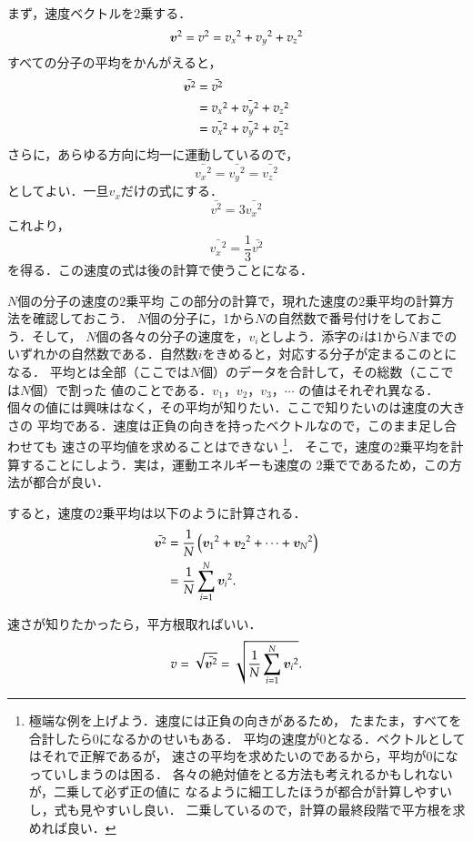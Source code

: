     まず，速度ベクトルを2乗する．
    \[
        {\boldsymbol{v}}^{2} = {v}^{2} = {{v}_{x}}^{2} + {{v}_{y}}^{2} + {{v}_{z}}^{2}
    \]
    すべての分子の平均をかんがえると，
    \begin{align*}
        \bar{{\boldsymbol{v}}^{2}} &= \bar{{v}^{2}} \\
                        &= \bar{{{v}_{x}}^{2} + {{v}_{y}}^{2} + {{v}_{z}}^{2}} \\
                        &= \bar{{{v}_{x}}^{2}} + \bar{{{v}_{y}}^{2}} + \bar{{{v}_{z}}^{2}}
    \end{align*}
    さらに，あらゆる方向に均一に運動しているので，
    \[
        \bar{{{v}_{x}}^{2}} = \bar{{{v}_{y}}^{2}} = \bar{{{v}_{z}}^{2}}
    \]
    としてよい．一旦${v}_{x}$だけの式にする．
    \[
        \bar{{v}^{2}} = 3\bar{{{v}_{x}}^{2}}
    \]
    これより，
    \begin{equation}
        \bar{{{v}_{x}}^{2}} = \frac{1}{3} \bar{{v}^{2}}
    \end{equation}
    を得る．この速度の式は後の計算で使うことになる．

    \begin{memo}{$N$個の分子の速度の2乗平均}
        この部分の計算で，現れた速度の2乗平均の計算方法を確認しておこう．
        $N$個の分子に，1から$N$の自然数で番号付けをしておこう．そして，
        $N$個の各々の分子の速度を，${v}_{i}$としよう．添字の$i$は1から$N$までの
        いずれかの自然数である．自然数$i$をきめると，対応する分子が定まるこのとになる．
        平均とは全部（ここでは$N$個）のデータを合計して，その総数（ここでは$N$個）で割った
        値のことである．${v}_{1}$，${v}_{2}$，${v}_{3}$，$\cdots$ の値はそれぞれ異なる．
        個々の値には興味はなく，その平均が知りたい．ここで知りたいのは速度の大きさの
        平均である．速度は正負の向きを持ったベクトルなので，このまま足し合わせても
        速さの平均値を求めることはできない
            \footnote{
                極端な例を上げよう．速度には正負の向きがあるため，
                たまたま，すべてを合計したら0になるかのせいもある．
                平均の速度が0となる．ベクトルとしてはそれで正解であるが，
                速さの平均を求めたいのであるから，平均が0になっていしまうのは困る．
                各々の絶対値をとる方法も考えれるかもしれないが，二乗して必ず正の値に
                なるように細工したほうが都合が計算しやすいし，式も見やすいし良い．
                二乗しているので，計算の最終段階で平方根を求めれば良い．
            }．
        そこで，速度の2乗平均を計算することにしよう．実は，運動エネルギーも速度の
        2乗でであるため，この方法が都合が良い．

        すると，速度の2乗平均は以下のように計算される．
        \begin{align*}
            \bar{{\boldsymbol{v}}^{2}} &= \frac{1}{N} \left( {{\boldsymbol{v}}_{1}}^{2} + {{\boldsymbol{v}}_{2}}^{2} + \cdots + {{\boldsymbol{v}}_{N}}^{2} \right ) \\
                            &= \frac{1}{N} \sum_{i=1}^{N} {{\boldsymbol{v}}_{i}}^{2}.
        \end{align*}

        速さが知りたかったら，平方根取ればいい．
        \[
            v = \sqrt{\bar{{\boldsymbol{v}}^{2}}} = \sqrt{\frac{1}{N} \sum_{i=1}^{N} {{\boldsymbol{v}}_{i}}^{2}}.
        \]
    \end{memo}


